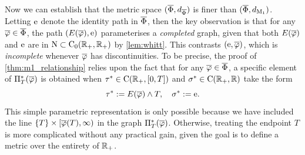 Now we can establish that the metric space $(\overline{\Phi},d_{\overline{\Phi}})$ is finer than $(\overline{\Phi},d_{\mathrm{M}_1})$. Letting $\mathrm{e}$ denote the identity path in $\overline{\Phi}$, then the key observation is that for any $\overline{\varphi}\in\overline{\Phi}$, the path $(E(\overline{\varphi}),\mathrm{e})$ parameterises a \emph{completed} graph, given that both $E(\overline{\varphi})$ and $\mathrm{e}$ are in $\mathrm{N}\subset\mathrm{C}_0(\mathbb{R}_+,\mathbb{R}_+)$ by \autoref{lem:whitt}. This contrasts $(\mathrm{e},\overline{\varphi})$, which is \emph{incomplete} whenever $\overline{\varphi}$ has discontinuities. To be precise, the proof of \autoref{thm:m1_relationship} relies upon the fact that for any $\overline{\varphi}\in\overline{\Phi}$, a specific element of $\Pi^*_T(\overline{\varphi})$ is obtained when $\tau^*\in\mathrm{C}(\mathbb{R}_+,[0,T])$ and $\sigma^*\in\mathrm{C}(\mathbb{R}_+,\mathbb{R})$ take the form
\begin{equation}\label{eq:para_rep}
    \tau^* := E(\overline{\varphi})\wedge T,\quad \sigma^* :=\mathrm{e}.
\end{equation}
This simple parametric representation is only possible because we have included the line $\{T\}\times[\overline{\varphi}(T),\infty)$ in the graph $\Pi^*_T(\overline{\varphi})$. Otherwise, treating the endpoint $T$ is more complicated without any practical gain, given the goal is to define a metric over the entirety of $\mathbb{R}_+$.

